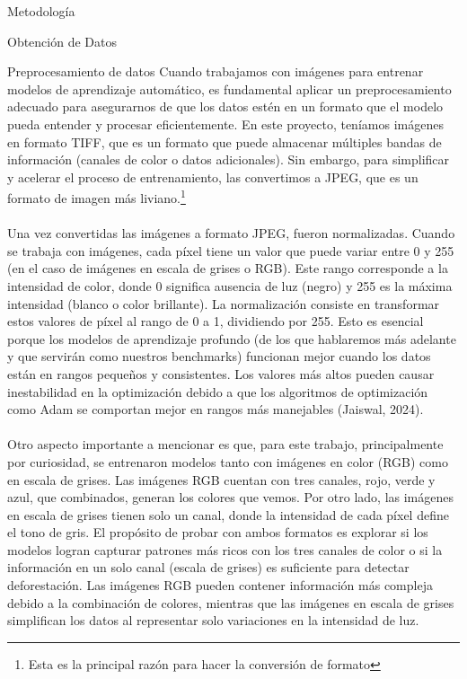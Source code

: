 \documentclass[11pt]{article}
\begin{document}
\begin{section}{Metodología}
\begin{subsection}{Obtención de Datos}
\begin{subsection}{Preprocesamiento de datos}
Cuando trabajamos con imágenes para entrenar modelos de aprendizaje automático, es fundamental aplicar un preprocesamiento adecuado para asegurarnos de que los datos estén en un formato que el modelo pueda entender y procesar eficientemente. En este proyecto, teníamos imágenes en formato TIFF, que es un formato que puede almacenar múltiples bandas de información (canales de color o datos adicionales). Sin embargo, para simplificar y acelerar el proceso de entrenamiento, las convertimos a JPEG, que es un formato de imagen más liviano.\footnote{Esta es la principal razón para hacer la conversión de formato}
\\
\\
Una vez convertidas las imágenes a formato JPEG, fueron normalizadas. Cuando se trabaja con imágenes, cada píxel tiene un valor que puede variar entre 0 y 255 (en el caso de imágenes en escala de grises o RGB). Este rango corresponde a la intensidad de color, donde 0 significa ausencia de luz (negro) y 255 es la máxima intensidad (blanco o color brillante). La normalización consiste en transformar estos valores de píxel al rango de 0 a 1, dividiendo por 255. Esto es esencial porque los modelos de aprendizaje profundo (de los que hablaremos más adelante y que servirán como nuestros benchmarks) funcionan mejor cuando los datos están en rangos pequeños y consistentes. Los valores más altos pueden causar inestabilidad en la optimización debido a que los algoritmos de optimización como Adam se comportan mejor en rangos más manejables (Jaiswal, 2024).
\\
\\
Otro aspecto importante a mencionar es que, para este trabajo, principalmente por curiosidad, se entrenaron modelos tanto con imágenes en color (RGB) como en escala de grises. Las imágenes RGB cuentan con tres canales, rojo, verde y azul, que combinados, generan los colores que vemos. Por otro lado, las imágenes en escala de grises tienen solo un canal, donde la intensidad de cada píxel define el tono de gris. El propósito de probar con ambos formatos es explorar si los modelos logran capturar patrones más ricos con los tres canales de color o si la información en un solo canal (escala de grises) es suficiente para detectar deforestación. Las imágenes RGB pueden contener información más compleja debido a la combinación de colores, mientras que las imágenes en escala de grises simplifican los datos al representar solo variaciones en la intensidad de luz. 
\\

\end{subsection}
\end{subsection}
\end{section}
\end{document}
